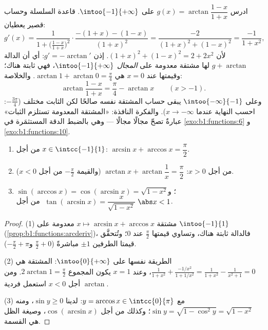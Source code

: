\begin{example}\label{ex:b1:functions:hiddenconst}
ادرس $g(x) = \arctan\dfrac{1 - x}{1 + x}$ على $\intoo{-1}
{+\infty}$. قاعدة السلسلة وحساب قصير يعطيان:
\[
g'(x) = \frac{1}{1 + \bigl(\frac{1-x}{1+x}\bigr)^2}\cdot
\frac{-(1+x) - (1-x)}{(1+x)^2}
= \frac{-2}{(1+x)^2 + (1-x)^2}
= \frac{-1}{1 + x^2} ,
\]
لأن $(1+x)^2 + (1-x)^2 = 2 + 2x^2$. إذن $g' = -\arctan'$: أي أن
الدالة $g + \arctan$ لها مشتقة معدومة على \emph{المجال}
$\intoo{-1}{+\infty}$، فهي ثابتة هناك؛ وقيمتها عند $x =
0$ هي $\arctan 1 + \arctan 0 = \frac\pi4$. والخلاصة:
\[
\arctan\frac{1 - x}{1 + x} = \frac\pi4 - \arctan x
\qquad (x > -1) .
\]
وعلى $\intoo{-\infty}{-1}$ يبقى حساب المشتقة نفسه صالحًا لكن
الثابت مختلف ($-\frac{3\pi}4$: احسب النهاية عندما
$x \to -\infty$). والفكرة النافذة:  «المشتقة المعدومة تستلزم
الثبات» عبارةٌ تصحّ مجالًا مجالًا --- وهي بالضبط
الدقة المستثمَرة في \cref{exo:b1:functions:6} و
\cref{exo:b1:functions:10}.
\end{example}

\begin{proposition}\label{prop:b1:functions:arcidentities}
\begin{enumerate}
  \item من أجل $x \in \intcc{-1}{1}$: $\arcsin x + \arccos x =
        \dfrac{\pi}{2}$.
  \item من أجل $x > 0$: $\arctan x + \arctan\dfrac 1x = \dfrac{\pi}{2}$
        (والقيمة $-\frac\pi2$ من أجل $x < 0$).
  \item $\sin(\arccos x) = \cos(\arcsin x) = \sqrt{1 - x^2}$؛
        و$\;\tan(\arcsin x) = \dfrac{x}{\sqrt{1 - x^2}}$ من أجل
        $\abs x < 1$.
\end{enumerate}
\end{proposition}

\begin{proof}
(1) مشتقة $x \mapsto \arcsin x + \arccos x$ معدومة على
$\intoo{-1}{1}$ (\cref{prop:b1:functions:arcderiv})، فالدالة
ثابتة هناك، وتساوي قيمتها $\frac\pi2$ عند $0$؛ وتُتحقَّق قيمتا
الطرفين $\pm 1$ مباشرةً ($\frac\pi2 + 0$ و$-\frac\pi2 +
\pi$).

(2) الطريقة نفسها على $\intoo{0}{+\infty}$: المشتقة هي
$\frac{1}{1+x^2} + \frac{-1/x^2}{1 + 1/x^2} = \frac{1}{1+x^2} -
\frac{1}{x^2 + 1} = 0$، وعند $x = 1$ يكون المجموع $2\arctan 1 =
\frac\pi2$. ومن أجل $x < 0$ استعمل فردية $\arctan$.

(3) مع $y = \arccos x \in \intcc{0}{\pi}$: لدينا $\sin y \geq 0$، ومنه
$\sin y = \sqrt{1 - \cos^2 y} = \sqrt{1 - x^2}$؛ وكذلك من أجل
$\cos(\arcsin x)$، وصيغة الظل هي القسمة.
\end{proof}

